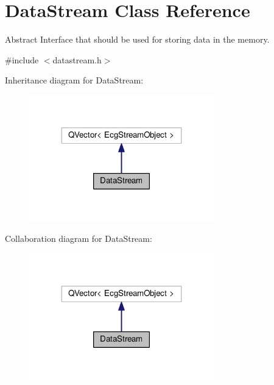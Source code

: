 \hypertarget{classDataStream}{}\section{Data\+Stream Class Reference}
\label{classDataStream}


Abstract Interface that should be used for storing data in the memory.  




{\ttfamily \#include $<$datastream.\+h$>$}



Inheritance diagram for Data\+Stream\+:
\nopagebreak
\begin{figure}[H]
\begin{center}
\leavevmode
\includegraphics[width=227pt]{classDataStream__inherit__graph}
\end{center}
\end{figure}


Collaboration diagram for Data\+Stream\+:
\nopagebreak
\begin{figure}[H]
\begin{center}
\leavevmode
\includegraphics[width=227pt]{classDataStream__coll__graph}
\end{center}
\end{figure}
